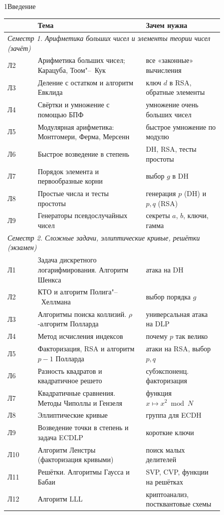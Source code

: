 \begin{lecture}{1}{Введение}
\begin{center}\small
\begin{tabular}{lp{0.5\linewidth}p{0.36\linewidth}}
\hline
& Тема & Зачем нужна \\
\hline
\multicolumn{3}{l}{\emph{Семестр 1. Арифметика больших чисел и элементы теории чисел (зачёт)}} \\
Л2 & Арифметика больших чисел; Карацуба, Тоом"--~Кук & все «законные» вычисления \\
Л3 & Деление с остатком и алгоритм Евклида & ключ $d$ в RSA, обратные элементы \\
Л4 & Свёртки и умножение с помощью БПФ & умножение очень больших чисел \\
Л5 & Модулярная арифметика: Монтгомери, Ферма, Мерсенн & быстрое умножение по модулю \\
Л6 & Быстрое возведение в степень & DH, RSA, тесты простоты \\
Л7 & Порядок элемента и первообразные корни & выбор $g$ в DH \\
Л8 & Простые числа и тесты простоты & генерация $p$ (DH) и $p, q$ (RSA) \\
Л9 & Генераторы псевдослучайных чисел & секреты $a$, $b$, ключи, гамма \\
\hline
\multicolumn{3}{l}{\emph{Семестр 2. Сложные задачи, эллиптические кривые, решётки (экзамен)}} \\
Л1 & Задача дискретного логарифмирования. Алгоритм Шенкса & атака на DH \\
Л2 & КТО и алгоритм Полига"--~Хеллмана & выбор порядка $g$ \\
Л3 & Алгоритмы поиска коллизий. $\rho$-алгоритм Полларда & универсальная атака на DLP \\
Л4 & Метод исчисления индексов & почему $p$ так велико \\
Л5 & Факторизация, RSA и алгоритм $p - 1$ Полларда & атаки на RSA, выбор $p, q$ \\
Л6 & Разность квадратов и квадратичное решето & субэкспоненц. факторизация \\
Л7 & Квадратичные сравнения. Методы Чиполлы и Гензеля & функция $x \mapsto x^2 \bmod N$ \\
Л8 & Эллиптические кривые & группа для ECDH \\
Л9 & Возведение точки в степень и задача ECDLP & короткие ключи \\
Л10 & Алгоритм Ленстры (факторизация кривыми) & поиск малых делителей \\
Л11 & Решётки. Алгоритмы Гаусса и Бабаи & SVP, CVP, функции на решётках \\
Л12 & Алгоритм LLL & криптоанализ, постквантовые схемы \\
\hline
\end{tabular}
\end{center}


\end{lecture}
